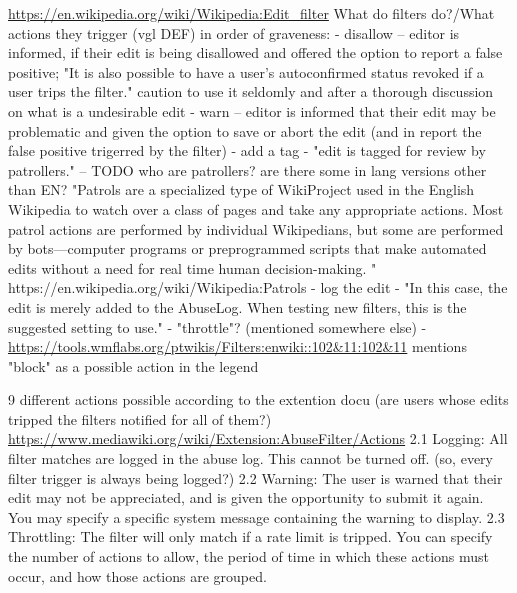 \documentclass{sigchi}
\begin{document}
\url{https://en.wikipedia.org/wiki/Wikipedia:Edit_filter}
What do filters do?/What actions they trigger (vgl DEF) in order of graveness:
- disallow -- editor is informed, if their edit is being disallowed and offered the option to report a false positive;
  "It is also possible to have a user's autoconfirmed status revoked if a user trips the filter."
  caution to use it seldomly and after a thorough discussion on what is a undesirable edit
- warn -- editor is informed that their edit may be problematic and given the option to save or abort the edit (and in report the false positive trigerred by the filter)
- add a tag - "edit is tagged for review by patrollers." -- TODO who are patrollers? are there some in lang versions other than EN?
  "Patrols are a specialized type of WikiProject used in the English Wikipedia to watch over a class of pages and take any appropriate actions. Most patrol actions are performed by individual Wikipedians, but some are performed by bots—computer programs or preprogrammed scripts that make automated edits without a need for real time human decision-making. " https://en.wikipedia.org/wiki/Wikipedia:Patrols
- log the edit - "In this case, the edit is merely added to the AbuseLog. When testing new filters, this is the suggested setting to use."
- "throttle"? (mentioned somewhere else)
- \url{https://tools.wmflabs.org/ptwikis/Filters:enwiki::102&11:102&11} mentions "block" as a possible action in the legend

9 different actions possible according to the extention docu (are users whose edits tripped the filters notified for all of them?)
\url{https://www.mediawiki.org/wiki/Extension:AbuseFilter/Actions}
    2.1 Logging: All filter matches are logged in the abuse log. This cannot be turned off.  (so, every filter trigger is always being logged?)
    2.2 Warning: The user is warned that their edit may not be appreciated, and is given the opportunity to submit it again. You may specify a specific system message containing the warning to display.
    2.3 Throttling: The filter will only match if a rate limit is tripped. You can specify the number of actions to allow, the period of time in which these actions must occur, and how those actions are grouped.
\end{document}
